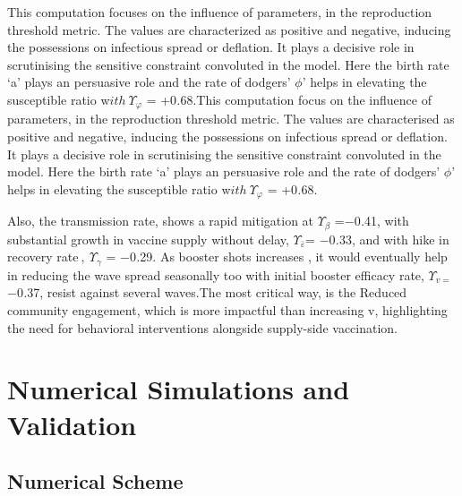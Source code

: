 \documentclass[10pt]{NSP1}
\begin{document}
This computation focuses on the influence of parameters, in the reproduction threshold metric. The values are characterized as positive and negative, inducing the possessions on infectious spread or deflation. It plays a decisive role in scrutinising the sensitive constraint convoluted in the model. Here the birth rate `a' plays an persuasive role and the rate of dodgers' $\phi$' helps in elevating the susceptible ratio w\(ith\ \Upsilon_{\varphi}\) = +0\emph{.}68.This computation focus on the influence of parameters, in the reproduction threshold metric. The values are characterised as positive and negative, inducing the possessions on infectious spread or deflation. It plays a decisive role in scrutinising the sensitive constraint convoluted in the model. Here the birth rate `a' plays an persuasive role and the rate of dodgers' $\phi$' helps in elevating the susceptible ratio w\(ith\ \Upsilon_{\varphi}\) = +0\emph{.}68.


Also, the transmission rate, shows a rapid mitigation at \(\Upsilon_{\beta}\) =$-$0\emph{.}41, with substantial growth in vaccine supply without delay, \(\Upsilon_{\bar{\varepsilon}}\)= $-$0\emph{.}33, and with hike in recovery rate\(\ ,\ \Upsilon_{\gamma}\) = $-$0\emph{.}29. As booster shots increases , it would eventually help in reducing the wave spread seasonally too with initial booster efficacy rate, \(\Upsilon_{v =}\)$-$0\emph{.}37, resist against several waves.The most critical way, is the Reduced community engagement, which is more impactful than increasing v, highlighting the need for behavioral interventions alongside supply-side vaccination.

\section{Numerical Simulations and Validation}

\subsection{Numerical Scheme}
\end{document}
